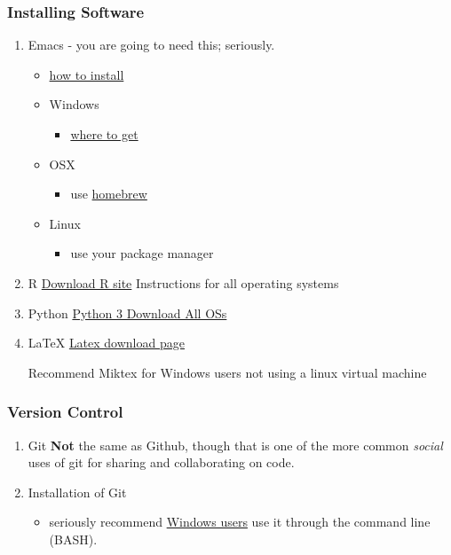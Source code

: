\documentclass{article}
\begin{document}
\subsubsection{Installing Software}
\label{sec:orga14ff86}
\begin{enumerate}
\item Emacs - you are going to need this; seriously.
\label{sec:org7236ab4}
\begin{itemize}
\item \href{https://www.gnu.org/software/emacs/download.html}{how to install}
\item Windows
\begin{itemize}
\item \href{http://ftpmirror.gnu.org/emacs/windows}{where to get}
\end{itemize}
\item OSX
\begin{itemize}
\item use \href{https://brew.sh/}{homebrew}
\end{itemize}
\item Linux 
\begin{itemize}
\item use your package manager
\end{itemize}
\end{itemize}
\item R
\label{sec:org28506ae}
\href{http://cran.utstat.utoronto.ca/}{Download R site} Instructions for all operating systems
\item Python
\label{sec:org846d0ce}
\href{https://www.python.org/downloads/}{Python 3 Download All OSs}
\item \LaTeX{}
\label{sec:org079bbe7}
\href{https://www.latex-project.org/get/}{Latex download page}

Recommend Miktex for Windows users not using a linux virtual machine
\end{enumerate}
\subsubsection{Version Control}
\label{sec:org2028ea6}
\begin{enumerate}
\item Git
\label{sec:orgcbd73a7}
\textbf{\textbf{Not}} the same as Github, though that is one of the more common \emph{social} uses of git for sharing and collaborating on code. 
\item Installation of Git
\label{sec:org2108366}
\begin{itemize}
\item seriously recommend \href{https://gitforwindows.org/}{Windows users} use it through the command line (BASH).
\end{itemize}
\end{enumerate}
\end{document}
